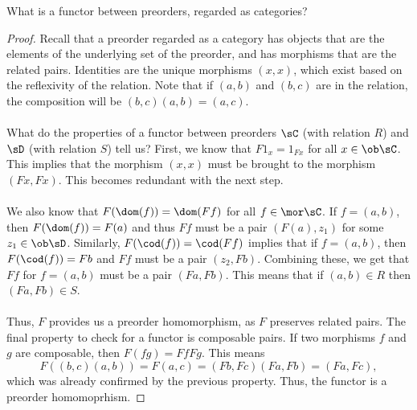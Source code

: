 \documentclass[main.tex]{subfiles}
\begin{document}

\begin{exercise}
	What is a functor between preorders, regarded as categories?
\end{exercise}

\begin{proof}
	Recall that a preorder regarded as a category has objects that are the
	elements of the underlying set of the preorder, and has morphisms that are
	the related pairs.  Identities are the unique morphisms $(x,x)$, which exist
	based on the reflexivity of the relation.  Note that if $(a,b)$ and $(b,c)$
	are in the relation, the composition will be $(b,c)(a,b) = (a,c)$.\\ \\ What
	do the properties of a functor between preorders $\sC$ (with relation $R$) and
	$\sD$ (with relation $S$) tell us?  First, we know that $F1_x = 1_{Fx}$
	for all $x \in \ob\sC$.  This implies that the morphism $(x,x)$ must be brought
	to the morphism $(Fx,Fx)$.  This becomes redundant with the next step.
	\\ \\ We also know that $F(\dom(f)) = \dom(Ff)$ for all $f \in \mor\sC$.  If
	$f = (a,b)$, then $F(\dom(f)) = F(a)$ and thus $Ff$ must be a pair $(F(a),
	z_1)$ for some $z_1 \in \ob\sD$.  Similarly, $F(\cod(f)) = \cod(Ff)$ implies
	that if $f = (a,b)$, then $F(\cod(f)) = Fb$ and $Ff$ must be a pair
	$(z_2,Fb)$.  Combining these, we get that $Ff$ for $f = (a,b)$ must be a
	pair $(Fa,Fb)$.  This means that if $(a,b) \in R$  then $(Fa,Fb) \in
	S$.  \\ \\ Thus, $F$ provides us a preorder homomorphism, as $F$ preserves
	related pairs.  The final property to check for a functor is composable
	pairs.  If two morphisms $f$ and $g$ are composable, then $F(fg) =
	FfFg$.  This means $$F((b,c)(a,b)) = F(a,c) = (Fb,Fc)(Fa,Fb) =
	(Fa,Fc),$$ which was already confirmed by the previous property.  Thus,
	the functor is a preorder homomoprhism.
\end{proof}
\end{document}
